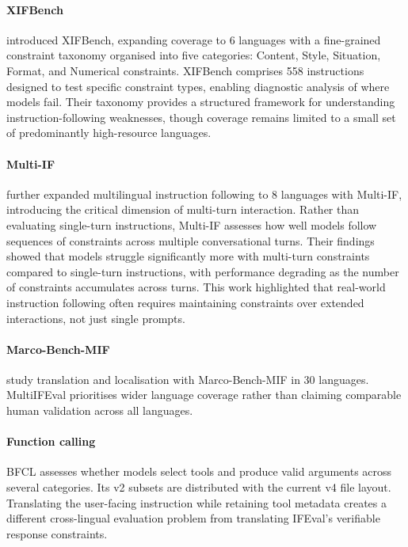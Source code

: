 \documentclass[11pt]{article}
\begin{document}
\paragraph{XIFBench}
\cite{li2025xifbench} introduced XIFBench, expanding coverage to 6 languages with a fine-grained constraint taxonomy organised into five categories: Content, Style, Situation, Format, and Numerical constraints. XIFBench comprises 558 instructions designed to test specific constraint types, enabling diagnostic analysis of where models fail. Their taxonomy provides a structured framework for understanding instruction-following weaknesses, though coverage remains limited to a small set of predominantly high-resource languages.

\paragraph{Multi-IF}
\cite{he2024multi} further expanded multilingual instruction following to 8 languages with Multi-IF, introducing the critical dimension of multi-turn interaction. Rather than evaluating single-turn instructions, Multi-IF assesses how well models follow sequences of constraints across multiple conversational turns. Their findings showed that models struggle significantly more with multi-turn constraints compared to single-turn instructions, with performance degrading as the number of constraints accumulates across turns. This work highlighted that real-world instruction following often requires maintaining constraints over extended interactions, not just single prompts.

\paragraph{Marco-Bench-MIF}
\cite{zeng-etal-2025-marco} study translation and localisation with
Marco-Bench-MIF in 30 languages. MultiIFEval prioritises wider language coverage
rather than claiming comparable human validation across all languages.

\paragraph{Function calling}
BFCL \cite{bfcl-upstream} assesses whether models select tools and produce
valid arguments across several categories. Its v2 subsets are distributed with
the current v4 file layout. Translating the user-facing instruction while
retaining tool metadata creates a different cross-lingual evaluation problem
from translating IFEval's verifiable response constraints.
\end{document}
